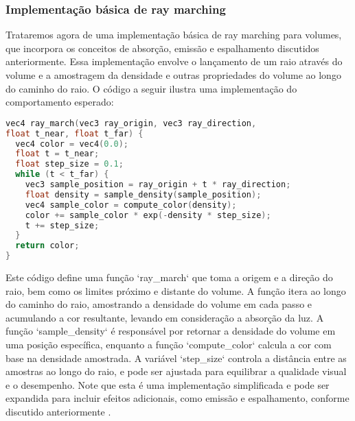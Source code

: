 \subsubsection{Implementação básica de ray marching}
Trataremos agora de uma implementação básica de ray marching para volumes, que incorpora os conceitos de absorção, emissão e espalhamento discutidos anteriormente. 
Essa implementação envolve o lançamento de um raio através do volume e a amostragem da densidade e outras propriedades do volume ao longo do caminho do raio. O código a seguir ilustra uma implementação do comportamento esperado:

\begin{lstlisting}[language=C]
vec4 ray_march(vec3 ray_origin, vec3 ray_direction,
float t_near, float t_far) {
  vec4 color = vec4(0.0);
  float t = t_near;
  float step_size = 0.1;
  while (t < t_far) {
    vec3 sample_position = ray_origin + t * ray_direction;
    float density = sample_density(sample_position);
    vec4 sample_color = compute_color(density);
    color += sample_color * exp(-density * step_size);
    t += step_size;
  }
  return color;
}
\end{lstlisting}

Este código define uma função `ray\_march` que toma a origem e a direção do raio, bem como os limites próximo e distante do volume. A função itera ao longo do caminho do raio, amostrando a densidade do volume em cada passo e acumulando a cor resultante, levando em consideração a absorção da luz. A função `sample\_density` é responsável por retornar a densidade do volume em uma posição específica, enquanto a função `compute\_color` calcula a cor com base na densidade amostrada. A variável `step\_size` controla a distância entre as amostras ao longo do raio, e pode ser ajustada para equilibrar a qualidade visual e o desempenho. Note que esta é uma implementação simplificada e pode ser expandida para incluir efeitos adicionais, como emissão e espalhamento, conforme discutido anteriormente \cite{Pharr2016}.
